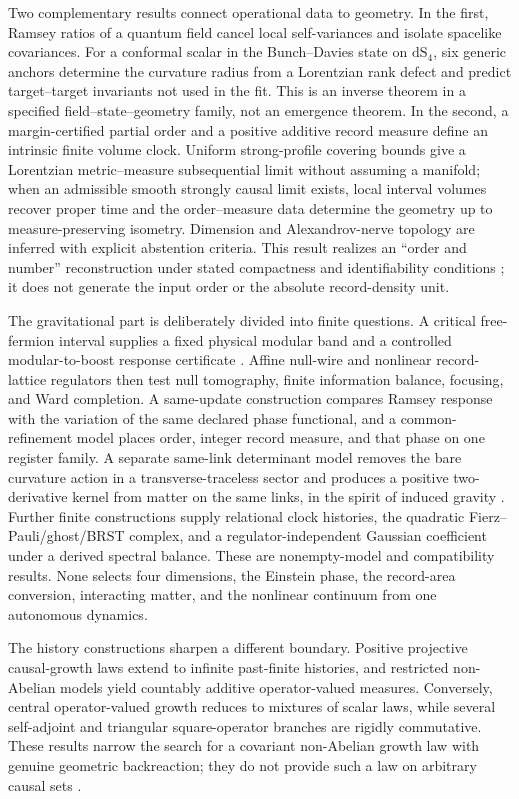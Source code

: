 \documentclass[11pt]{article}
\begin{document}
Two complementary results connect operational data to geometry.  In the
first, Ramsey ratios of a quantum field cancel local self-variances and
isolate spacelike covariances.  For a conformal scalar in the Bunch--Davies
state on \(\mathrm{dS}_4\), six generic anchors determine the curvature
radius from a Lorentzian rank defect and predict target--target invariants
not used in the fit.  This is an inverse theorem in a specified
field--state--geometry family, not an emergence theorem.  In the second, a
margin-certified partial order and a positive additive record measure define
an intrinsic finite volume clock.  Uniform strong-profile covering bounds
give a Lorentzian metric--measure subsequential limit without assuming a
manifold; when an admissible smooth strongly causal limit exists, local
interval volumes recover proper time and the order--measure data determine
the geometry up to measure-preserving isometry.  Dimension and
Alexandrov-nerve topology are inferred with explicit abstention criteria.
This result realizes an ``order and number'' reconstruction under stated
compactness and identifiability conditions
\cite{BraunSaemann2025,BraunOrderNumber2026}; it does not generate the input
order or the absolute record-density unit.

The gravitational part is deliberately divided into finite questions.  A
critical free-fermion interval supplies a fixed physical modular band and a
controlled modular-to-boost response certificate
\cite{BisognanoWichmann1975,Giudici2018}.  Affine null-wire and nonlinear
record-lattice regulators then test null tomography, finite information
balance, focusing, and Ward completion.  A same-update construction compares
Ramsey response with the variation of the same declared phase functional,
and a common-refinement model places order, integer record measure, and that
phase on one register family.  A separate same-link determinant model removes
the bare curvature action in a transverse-traceless sector and produces a
positive two-derivative kernel from matter on the same links, in the spirit
of induced gravity \cite{Sakharov1968,Adler1982,Visser2002}.  Further finite
constructions supply relational clock histories, the quadratic
Fierz--Pauli/ghost/BRST complex, and a regulator-independent Gaussian
coefficient under a derived spectral balance.  These are nonempty-model and
compatibility results.  None selects four dimensions, the Einstein phase,
the record-area conversion, interacting matter, and the nonlinear continuum
from one autonomous dynamics.

The history constructions sharpen a different boundary.  Positive
projective causal-growth laws extend to infinite past-finite histories, and
restricted non-Abelian models yield countably additive operator-valued
measures.  Conversely, central operator-valued growth reduces to mixtures of
scalar laws, while several self-adjoint and triangular square-operator
branches are rigidly commutative.  These results narrow the search for a
covariant non-Abelian growth law with genuine geometric backreaction; they
do not provide such a law on arbitrary causal sets
\cite{RideoutSorkin2000,Sorkin1994QuantumMeasure}.
\end{document}
